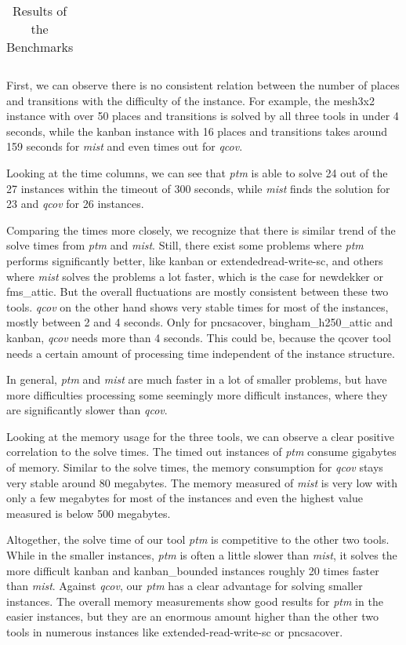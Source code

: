 \begin{table}[H]
{\begin{tabular}{c c c c c c c c c c}
\bottomrule
\end{tabular}%
}
\caption{Results of the Benchmarks}
\label{tab:mist-results}
\end{table}


First, we can observe there is no consistent relation between the number of places and transitions with the difficulty of the instance. For example, the mesh3x2 instance with over 50 places and transitions is solved by all three tools in under 4 seconds, while the kanban instance with 16 places and transitions takes around 159 seconds for \textit{mist} and even times out for \textit{qcov}.

Looking at the time columns, we can see that \textit{ptm} is able to solve  24 out of the 27 instances within the timeout of 300 seconds, while \textit{mist} finds the solution for 23 and \textit{qcov} for 26 instances.

Comparing the times more closely, we recognize that there is similar trend of the solve times from \textit{ptm} and \textit{mist}. Still, there exist some problems where \textit{ptm} performs significantly better, like kanban or extendedread-write-sc, and others where \textit{mist} solves the problems a lot faster, which is the case for newdekker or fms\_attic. But the overall fluctuations are mostly consistent between these two tools. 
\textit{qcov} on the other hand shows very stable times for most of the instances, mostly between 2 and 4 seconds. Only for pncsacover, bingham\_h250\_attic and kanban, \textit{qcov} needs more than 4 seconds. This could be, because the qcover tool needs a certain amount of processing time independent of the instance structure.

In general, \textit{ptm} and \textit{mist} are much faster in a lot of smaller problems, but have more difficulties processing some seemingly more difficult instances, where they are significantly slower than \textit{qcov}. 

Looking at the memory usage for the three tools, we can observe a clear positive correlation to the solve times. The timed out instances of \textit{ptm} consume gigabytes of memory. Similar to the solve times, the memory consumption for \textit{qcov} stays very stable around 80 megabytes. The memory measured of \textit{mist} is very low with only a few megabytes for most of the instances and even the highest value measured is below 500 megabytes.

Altogether, the solve time of our tool \textit{ptm} is competitive to the other two tools. While in the smaller instances, \textit{ptm} is often a little slower than \textit{mist}, it solves the more difficult kanban and kanban\_bounded instances roughly 20 times faster than \textit{mist}.
Against \textit{qcov}, our \textit{ptm} has a clear advantage for solving smaller instances. 
The overall memory measurements show good results for \textit{ptm} in the easier instances, but they are an enormous amount higher than the other two tools in numerous instances like extended-read-write-sc or pncsacover.

